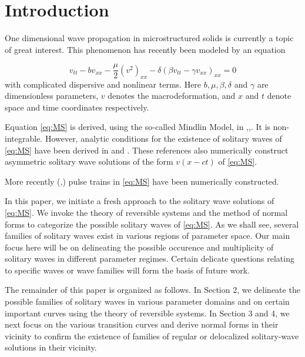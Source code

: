 \section{Introduction}

One dimensional wave propagation in microstructured solids is currently a topic of great interest.
This phenomenon has recently been modeled \cite{STE} by an equation

\begin{equation}\label{eq:MS}
v_{tt} - b v_{xx} - \frac{\mu}{2} \left( v^2 \right)_{xx} - \delta \left( \beta v_{tt} - \gamma v_{xx}\right)_{xx} = 0 
\end{equation}
with complicated dispersive and nonlinear terms. Here $b, \mu, \beta, \delta$
and $\gamma$ are dimensionless parameters, $v$ denotes the macrodeformation,
and $x$ and $t$ denote space and time coordinates respectively.

Equation \eqref{eq:MS} is derived, using the so-called Mindlin Model, in
\cite{JE1},\cite{JE2},\cite{STE}.  It is non-integrable. However, analytic
conditions for the existence of solitary waves of \eqref{eq:MS} have been
derived in \cite{JE2} and \cite{STE}. These references also numerically
construct asymmetric solitary wave solutions of the form $ v\left(x - c t
\right)$ of \eqref{eq:MS}.

More recently (\cite{EP},\cite{EBS}) pulse trains in \eqref{eq:MS} have been
numerically constructed.

In this paper, we initiate a fresh approach to the solitary wave solutions of
\eqref{eq:MS}.  We invoke the theory of reversible systems and the method of
normal forms to categorize the possible solitary waves of \eqref{eq:MS}.  As we
shall see, several families of solitary waves exist in various regions of
parameter space. Our main focus here will be on delineating the possible
occurence and multiplicity of solitary waves in different parameter regimes.
Certain delicate questions relating to specific waves or wave families will
form the basis of future work. 

The remainder of this paper is organized as follows. In Section 2, we delineate
the possible families of solitary waves in various parameter domains and on
certain important curves using the theory of reversible systems. In Section 3
and 4, we next focus on the various transition curves and derive normal forms
in their vicinity to confirm the existence of families of regular or
delocalized solitary-wave solutions in their vicinity.



